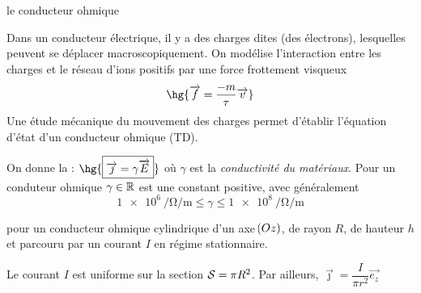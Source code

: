 \documentclass[a4paper,french,bookmarks]{book}
\begin{document}
    \begin{example}{le conducteur ohmique}{}
        \begin{enumerate}
            \itt {} Dans un conducteur électrique, il y a des charges dites  (des électrons), lesquelles peuvent se déplacer macroscopiquement. On modélise l'interaction entre les charges et le réseau d'ions positifs par une force frottement visqueux 
            \[ \hg{\vec f = \dfrac{-m}{\tau} \vec v} \]
            Une étude mécanique du mouvement des charges permet d'établir l'équation d'état d'un conducteur ohmique (\cf TD).
            
            
            On donne la  : \qquad $\hg{\boxed{\vec \jmath = \gamma \vec E}}$ où $\gamma$ est la \emph{conductivité du matériaux}. Pour un conduteur ohmique $\gamma \in \mathbb{R}$ est une constant positive, avec généralement 
            \[ \qty{1e6}{\per\ohm\per\meter} \leq \gamma \leq \qty{1e8}{\per \ohm \per \meter}\]
            
            \begin{minipage}{0.5\linewidth}
                \itt {} pour un conducteur ohmique cylindrique d'un axe $\!\left(Oz\right)$, de rayon $R$, de hauteur $h$ et parcouru par un courant $I$ en régime stationnaire.\medskip
                
                Le courant $I$ est uniforme sur la section $\mathcal{S} = \pi R^2$. Par ailleurs, $\vec \jmath  = \dfrac{I}{\pi r^2} \vec {e_z}$ 
            \end{minipage}
            \begin{minipage}{0.5\linewidth}
                \begin{center}
                    \pgfplotsset{compat=newest}
                    
\end{center}
\end{minipage}
\end{enumerate}
\end{example}
\end{document}
